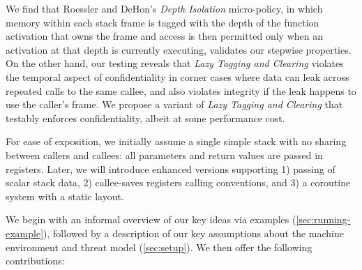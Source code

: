 \documentclass[10pt,conference]{ieeetran}%
\theoremstyle{definition}
\begin{document}
We find that Roessler and DeHon's {\em Depth Isolation} micro-policy, in
which memory within each stack frame is tagged with the depth of
the function activation that owns the frame and access is
then permitted only when an activation at that depth is currently executing, validates our
stepwise properties. On the other hand, our testing reveals that \emph{Lazy Tagging and Clearing}
violates the temporal aspect of confidentiality in
corner cases where data can leak across repeated calls to the same callee,
and also violates integrity if the leak happens to use the caller's frame. We
propose a variant of {\em Lazy Tagging and Clearing} that testably enforces
confidentiality, albeit at some performance cost.
%
\ifaftersubmission
{}
\fi

For ease of exposition, we initially assume a single simple
stack with no sharing between callers and callees: all parameters and return
values are passed in registers.  Later, we will introduce enhanced versions
supporting
1) passing of scalar stack data,
2) callee-saves registers calling conventions, and
3) a coroutine system with a static layout.

We begin with an informal overview of our key ideas via
examples (\cref{sec:running-example}), followed by a description of our key
assumptions about the machine environment and threat model (\cref{sec:setup}).
We then offer the following contributions:
\end{document}
